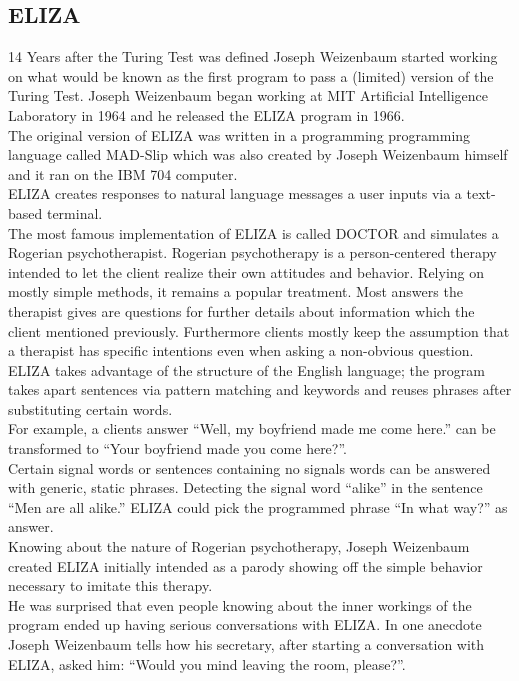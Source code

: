 \subsection{ELIZA}

14 Years after the Turing Test was defined Joseph Weizenbaum started working on what would be known as the first program to pass a (limited) version of the Turing Test. Joseph Weizenbaum began working at MIT Artificial Intelligence Laboratory in 1964 and he released the ELIZA program in 1966.
\\

The original version of ELIZA was written in a programming programming language called MAD-Slip which was also created by Joseph Weizenbaum himself and it ran on the IBM 704 computer.
\\
ELIZA creates responses to natural language messages a user inputs via a text-based terminal.
\\

The most famous implementation of ELIZA is called DOCTOR and simulates a Rogerian psychotherapist. Rogerian psychotherapy is a person-centered therapy intended to let the client realize their own attitudes and behavior. Relying on mostly simple methods, it remains a popular treatment. Most answers the therapist gives are questions for further details about information which the client mentioned previously. Furthermore clients mostly keep the assumption that a therapist has specific intentions even when asking a non-obvious question.
\\

ELIZA takes advantage of the structure of the English language; the program takes apart sentences via pattern matching and keywords and reuses phrases after substituting certain words.
\\
For example, a clients answer ``Well, my boyfriend made me come here.'' can be transformed to ``Your boyfriend made you come here?''\cite{elizatest}.
\\
Certain signal words or sentences containing no signals words can be answered with generic, static phrases. Detecting the signal word ``alike'' in the sentence ``Men are all alike.'' ELIZA could pick the programmed phrase ``In what way?'' as answer\cite{elizatest}.
\\

Knowing about the nature of Rogerian psychotherapy, Joseph Weizenbaum created ELIZA initially intended as a parody showing off the simple behavior necessary to imitate this therapy.
\\
He was surprised that even people knowing about the inner workings of the program ended up having serious conversations with ELIZA. In one anecdote Joseph Weizenbaum tells how his secretary, after starting a conversation with ELIZA, asked him: ``Would you mind leaving the room, please?''\cite[5]{weizenbaum}.
\\

